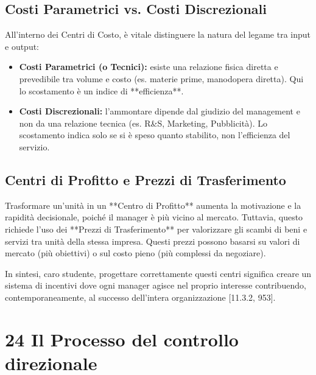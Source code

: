 \documentclass[a4paper,10pt]{article}
\begin{document}
\subsection*{Costi Parametrici vs. Costi Discrezionali}

All'interno dei Centri di Costo, è vitale distinguere la natura del legame tra input e output:
\begin{itemize}
    \item \textbf{Costi Parametrici (o Tecnici):} esiste una relazione fisica diretta e prevedibile tra volume e costo (es. materie prime, manodopera diretta). Qui lo scostamento è un indice di **efficienza**.
    \item \textbf{Costi Discrezionali:} l'ammontare dipende dal giudizio del management e non da una relazione tecnica (es. R\&S, Marketing, Pubblicità). Lo scostamento indica solo se si è speso quanto stabilito, non l'efficienza del servizio.
\end{itemize}

\subsection*{Centri di Profitto e Prezzi di Trasferimento}

Trasformare un'unità in un **Centro di Profitto** aumenta la motivazione e la rapidità decisionale, poiché il manager è più vicino al mercato. Tuttavia, questo richiede l'uso dei **Prezzi di Trasferimento** per valorizzare gli scambi di beni e servizi tra unità della stessa impresa. Questi prezzi possono basarsi su valori di mercato (più obiettivi) o sul costo pieno (più complessi da negoziare).

In sintesi, caro studente, progettare correttamente questi centri significa creare un sistema di incentivi dove ogni manager agisce nel proprio interesse contribuendo, contemporaneamente, al successo dell'intera organizzazione [11.3.2, 953].

\section*{24 Il Processo del controllo direzionale}
\end{document}
